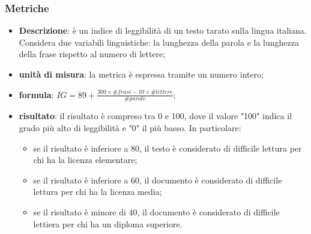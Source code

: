 	\subsubsection{Metriche}
			\begin{itemize}
				\item{\textbf{Descrizione}}: è un indice di leggibilità di un testo tarato sulla lingua italiana. Considera due variabili linguistiche: la lunghezza della parola e la lunghezza della frase rispetto al numero di lettere;
				\item{\textbf{unità di misura}}: la metrica è espressa tramite un numero intero;
				\item{\textbf{formula}}: $ IG=89+\frac{300 \times \#frasi -10\times \#lettere}{\#parole} $;
				\item{\textbf{risultato}}: il risultato è compreso tra 0 e 100, dove il valore "100" indica il grado più alto di leggibilità e "0" il più basso. In particolare:
					\begin{itemize}
						\item se il risultato è inferiore a 80, il testo è considerato di difficile lettura per chi ha la licenza elementare; 
						\item se il risultato è inferiore a 60, il documento è considerato di difficile lettura per chi ha la licenza media; 
						\item se il risultato è minore di 40, il documento è considerato di difficile lettiera per chi ha un diploma superiore. 
					\end{itemize}
			\end{itemize}
	
